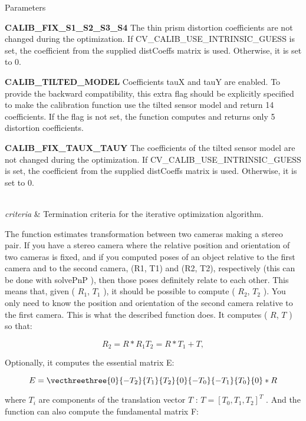 \begin{DoxyParams}{Parameters}
\begin{DoxyItemize}
\item {\bfseries C\+A\+L\+I\+B\+\_\+\+F\+I\+X\+\_\+\+S1\+\_\+\+S2\+\_\+\+S3\+\_\+\+S4} The thin prism distortion coefficients are not changed during the optimization. If C\+V\+\_\+\+C\+A\+L\+I\+B\+\_\+\+U\+S\+E\+\_\+\+I\+N\+T\+R\+I\+N\+S\+I\+C\+\_\+\+G\+U\+E\+SS is set, the coefficient from the supplied dist\+Coeffs matrix is used. Otherwise, it is set to 0.
\item {\bfseries C\+A\+L\+I\+B\+\_\+\+T\+I\+L\+T\+E\+D\+\_\+\+M\+O\+D\+EL} Coefficients tauX and tauY are enabled. To provide the backward compatibility, this extra flag should be explicitly specified to make the calibration function use the tilted sensor model and return 14 coefficients. If the flag is not set, the function computes and returns only 5 distortion coefficients.
\item {\bfseries C\+A\+L\+I\+B\+\_\+\+F\+I\+X\+\_\+\+T\+A\+U\+X\+\_\+\+T\+A\+UY} The coefficients of the tilted sensor model are not changed during the optimization. If C\+V\+\_\+\+C\+A\+L\+I\+B\+\_\+\+U\+S\+E\+\_\+\+I\+N\+T\+R\+I\+N\+S\+I\+C\+\_\+\+G\+U\+E\+SS is set, the coefficient from the supplied dist\+Coeffs matrix is used. Otherwise, it is set to 0. 
\end{DoxyItemize}\\
\hline
{\em criteria} & Termination criteria for the iterative optimization algorithm. \\
\hline
\end{DoxyParams}
The function estimates transformation between two cameras making a stereo pair. If you have a stereo camera where the relative position and orientation of two cameras is fixed, and if you computed poses of an object relative to the first camera and to the second camera, (R1, T1) and (R2, T2), respectively (this can be done with solve\+PnP ), then those poses definitely relate to each other. This means that, given ( $R_1$, $T_1$ ), it should be possible to compute ( $R_2$, $T_2$ ). You only need to know the position and orientation of the second camera relative to the first camera. This is what the described function does. It computes ( $R$, $T$ ) so that\+: 

\[R_2=R*R_1 T_2=R*T_1 + T,\] 

Optionally, it computes the essential matrix E\+: 

\[E= \vecthreethree{0}{-T_2}{T_1}{T_2}{0}{-T_0}{-T_1}{T_0}{0} *R\] 

where $T_i$ are components of the translation vector $T$ \+: $T=[T_0, T_1, T_2]^T$ . And the function can also compute the fundamental matrix F\+: 


